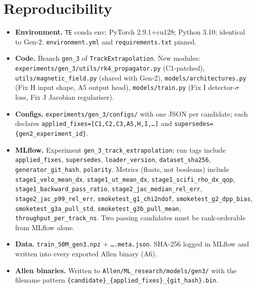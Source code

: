 \documentclass[a4paper,11pt]{article}
\begin{document}
\section{Reproducibility}\label{gen3:sec:repro}

\begin{itemize}
  \item \textbf{Environment.}  \texttt{TE} conda env; PyTorch
        2.9.1+cu128; Python 3.10; identical to Gen-2.
        \texttt{environment.yml} and \texttt{requirements.txt}
        pinned.
  \item \textbf{Code.}  Branch \texttt{gen\_3} of
        \texttt{TrackExtrapolation}.  New modules:
        \texttt{experiments/gen\_3/utils/rk4\_propagator.py}
        (C1-patched), \texttt{utils/magnetic\_field.py} (shared with
        Gen-2), \texttt{models/architectures.py} (Fix H input shape,
        A5 output head), \texttt{models/train.py} (Fix I
        detector-$\sigma$ loss, Fix J Jacobian regulariser).
  \item \textbf{Configs.}  \texttt{experiments/gen\_3/configs/}
        with one JSON per candidate; each declares
        \texttt{applied\_fixes=[C1,C2,C3,A5,H,I,\dots]} and
        \texttt{supersedes=\{gen2\_experiment\_id\}}.
  \item \textbf{MLflow.} Experiment
        \texttt{gen\_3\_track\_extrapolation}; run tags include
        \texttt{applied\_fixes}, \texttt{supersedes},
        \texttt{loader\_version}, \texttt{dataset\_sha256},
        \texttt{generator\_git\_hash}, \texttt{polarity}.
        Metrics (floats, not booleans) include
        \texttt{stage1\_velo\_mean\_dx},
        \texttt{stage1\_ut\_mean\_dx},
        \texttt{stage1\_scifi\_rho\_dx\_qop},
        \texttt{stage1\_backward\_pass\_ratio},
        \texttt{stage2\_jac\_median\_rel\_err},
        \texttt{stage2\_jac\_p99\_rel\_err},
        \texttt{smoketest\_g1\_chi2ndof},
        \texttt{smoketest\_g2\_dpp\_bias},
        \texttt{smoketest\_g3a\_pull\_std},
        \texttt{smoketest\_g3b\_pull\_mean},
        \texttt{throughput\_per\_track\_ns}.  Two passing candidates
        must be rank-orderable from MLflow alone.
  \item \textbf{Data.}  \texttt{train\_50M\_gen3.npz} +
        \texttt{\dots.meta.json}.  SHA-256 logged in MLflow and
        written into every exported Allen binary (A6).
  \item \textbf{Allen binaries.}  Written to
        \texttt{Allen/ML\_research/models/gen3/} with the filename
        pattern \texttt{\{candidate\}\_\{applied\_fixes\}\_\{git\_hash\}.bin}.
\end{itemize}
\end{document}
